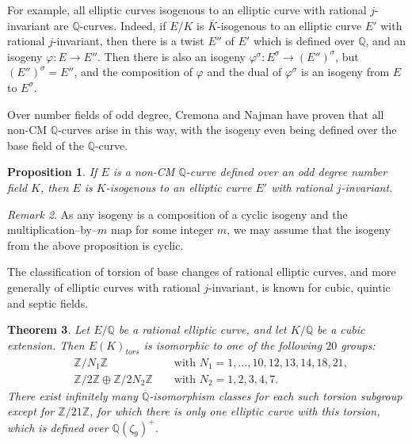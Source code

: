 \documentclass[10pt,leqno]{amsart}
\newcommand{\Z}{\mathbb{Z}}
\newcommand{\Q}{\mathbb{Q}}
\newtheorem{theorem}{Theorem}[]
\newtheorem{proposition}[theorem]{Proposition}
\theoremstyle{definition}
\theoremstyle{remark}
\newtheorem{remark}[theorem]{Remark}
\numberwithin{theorem}{section}
\begin{document}
For example, all elliptic curves isogenous to an elliptic curve with rational $j$-invariant are $\Q$-curves. Indeed, if $E/K$ is $\overline K$-isogenous to an elliptic curve $E'$ with rational $j$-invariant, then there is a twist $E''$ of $E'$ which is defined over $\Q$, and an isogeny $\varphi: E \to E''$. Then there is also an isogeny $\varphi^\sigma: E^\sigma \to (E'')^\sigma$, but $(E'')^\sigma=E''$, and the composition of $\varphi$ and the dual of $\varphi^\sigma$ is an isogeny from $E$ to $E^\sigma$.

Over number fields of odd degree, Cremona and Najman have proven that all non-CM $\Q$-curves arise in this way, with the isogeny even being defined over the base field of the $\Q$-curve.

\begin{proposition}\label{isog to rational j}\cite[Theorem 2.7.]{cremona-najman}
If $E$ is a non-CM $\Q$-curve defined over an odd degree number field $K$, then $E$ is $K$-isogenous to an elliptic curve $E'$ with rational $j$-invariant.    
\end{proposition}

\begin{remark}
    As any isogeny is a composition of a cyclic isogeny and the multiplication--by--$m$ map for some integer $m$, we may assume that the isogeny from the above proposition is cyclic.
\end{remark}

The classification of torsion of base changes of rational elliptic curves, and more generally of elliptic curves with rational $j$-invariant, is known for cubic, quintic and septic fields.

\begin{theorem}\cite[Theorem 1.]{basechanges}\label{basechanges}
    Let $E/\Q$ be a rational elliptic curve, and let $K/\Q$ be a cubic extension. Then $E(K)_{tors}$ is isomorphic to one of the following $20$ groups:
      \begin{align*}
            &\Z/N_1\Z && \text{ with } N_1=1,\ldots,10,12,13,14,18,21, \\
            &\Z/2\Z\oplus \Z/2N_2\Z && \text{ with } N_2=1,2,3,4,7.
        \end{align*}
There exist infinitely many $\overline{\Q}$-isomorphism classes for each such torsion subgroup except for $\Z/21\Z$, for which there is only one elliptic curve with this torsion, which is defined over $\Q(\zeta_9)^+$.
\end{theorem}
\end{document}
